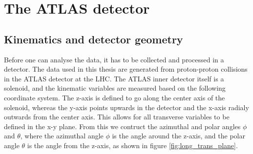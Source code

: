 \section{The ATLAS detector}

\subsection*{Kinematics and detector geometry}
Before one can analyse the data, it has to be collected and processed in a detector. The data used in this thesis 
are generated from proton-proton collisions in the ATLAS detector at the LHC. The ATLAS inner detector itself is a solenoid, 
and the kinematic variables are measured based on the following coordinate system. The z-axis is defined to go 
along the center axis of the solenoid, whereas the y-axis points upwards in the detector and the x-axis radialy 
outwards from the center axis. This allows for all transverse variables to be defined in the x-y plane\cite{Gramstad:1631043}. 
From this we contruct the azimuthal and polar angles $\phi$ and $\theta$, where the azimuthal angle $\phi$\cite{Airapetian:391176} is the angle around the z-axis, 
and the polar angle $\theta$ is the angle from the z-axis, as shown in figure \ref{fig:long_trans_plane}.


